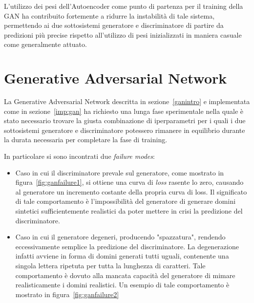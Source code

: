 \newpage
L'utilizzo dei pesi dell'Autoencoder come punto di partenza per il training della GAN ha contribuito fortemente a ridurre la instabilità di tale sistema, permettendo ai due sottosistemi generatore e discriminatore di partire da predizioni più precise rispetto all'utilizzo di pesi inizializzati in maniera casuale come generalmente attuato.


\newpage
\section{Generative Adversarial Network}
\label{ris:gan}
La Generative Adversarial Network descritta in sezione~\ref{ganintro} e implementata come in sezione~\ref{imp:gan} ha richiesto una lunga fase sperimentale nella quale è stato necessario trovare la giusta combinazione di iperparametri per i quali i due sottosistemi generatore e discriminatore potessero rimanere in equilibrio durante la durata necessaria per completare la fase di training. 

In particolare si sono incontrati due \textit{failure modes}:
\begin{itemize}
\item Caso in cui il discriminatore prevale sul generatore, come mostrato in figura~\ref{fig:ganfailure1}, si ottiene una curva di \textit{loss} rasente lo zero, causando al generatore un incremento costante della propria curva di loss. Il significato di tale comportamento è l'impossibilità del generatore di generare domini sintetici sufficientemente realistici da poter mettere in crisi la predizione del discriminatore.
\item Caso in cui il generatore degeneri, producendo "spazzatura", rendendo eccessivamente semplice la predizione del discriminatore. La degenerazione infatti avviene in forma di domini generati tutti uguali, contenente una singola lettera ripetuta per tutta la lunghezza di caratteri. Tale comportamento è dovuto alla mancata capacità del generatore di mimare realisticamente i domini realistici. Un esempio di tale comportamento è mostrato in figura~\ref{fig:ganfailure2}
\end{itemize}

